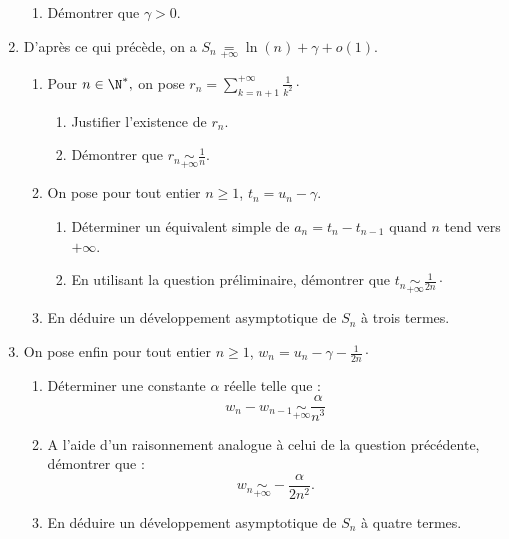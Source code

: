 \documentclass[a4paper,french,11pt,twoside]{VcCours}
\begin{document}
\begin{enumerate}
\begin{enumerate}
	\item Démontrer que $\gamma>0.$
	
	
	
\end{enumerate}
	
	
	
	\item D'après ce qui précède, on a $S_n \underset{+ \infty}{=} \ln(n)+\gamma+ o(1).$ 
	
	
	\begin{enumerate}
	
	\item Pour $n\in\N^*,$ on pose $r_n=\sum_{k=n+1}^{+\infty}\frac{1}{k^2} \cdot$
	
	
	\begin{enumerate}
	
	\item Justifier l'existence de $r_n.$
	
	\item Démontrer que $r_n\mathop{\sim}\limits_{+ \infty}\frac{1}{n}.$
	\end{enumerate} 
	
		\item On pose pour tout entier $n \geq 1$, $t_n=u_n-\gamma.$
		\begin{enumerate}
			\item  Déterminer un équivalent simple de $a_n=t_n-t_{n-1}$ quand $n$ tend vers $+ \infty$. 
			
			\item En utilisant la question préliminaire, démontrer que $t_n\mathop{\sim}\limits_{+\infty}\frac{1}{2n} \cdot$ 
			
		\end{enumerate}
		
		\item En déduire un développement asymptotique de $S_n$ à trois termes.
	\end{enumerate}
	
	
	
	\item On pose enfin pour tout entier $n \geq 1$, $w_n=u_n-\gamma-\frac{1}{2n} \cdot$
	
	
	\begin{enumerate}
		\item Déterminer une constante $\alpha$ réelle telle que :
		 $$w_n-w_{n-1}\mathop{\sim}\limits_{+\infty}\frac{\alpha}{n^3}$$
		
		\item A l'aide d'un raisonnement analogue à celui de la question précédente, démontrer que :
		$$w_n\mathop{\sim}\limits_{+\infty}-\frac{\alpha}{2n^2}.$$
		
		
		\item En déduire un développement asymptotique de $S_n$ à quatre termes.
		
	\end{enumerate}
	\end{enumerate}
\end{document}

